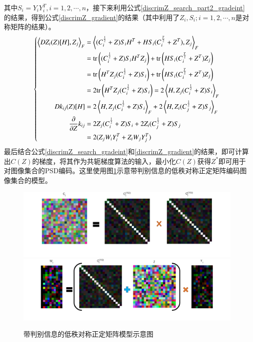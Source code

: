 其中$S_{i}=Y_{i}Y_{i}^{T},i=1,2,\cdots,n$，接下来利用公式\ref{discrimZ_search_part2_gradeint}的结果，得到公式\ref{discrimZ_gradient}的结果（其中利用了$Z_{i},S_{i};i=1,2,\cdots,n$是对称矩阵的结果）。
\begin{equation}
\label{discrimZ_gradient}
\left\{
\begin{split}
\left<DZ_i(Z)[H],Z_j\right>_{F}&=\left<(C_{i}^{\frac{1}{2}}+Z)S_{i}H^{T}+HS_{i}(C_{i}^{\frac{T}{2}}+Z^{T}),Z_j\right>_{F}\\
&={\rm tr}\left((C_{i}^{\frac{1}{2}}+Z)S_{i}H^{T}Z_j\right)+{\rm tr}\left(HS_{i}(C_{i}^{\frac{T}{2}}+Z^{T})Z_j\right)\\
&={\rm tr}\left(H^{T}Z_j(C_{i}^{\frac{1}{2}}+Z)S_{i}\right)+{\rm tr}\left(HS_{i}(C_{i}^{\frac{T}{2}}+Z^{T})Z_j\right)\\
&=2{\rm tr}\left(H^{T}Z_j(C_{i}^{\frac{1}{2}}+Z)S_{i}\right)=2\left<H,Z_j(C_{i}^{\frac{1}{2}}+Z)S_{i}\right>_{F}\\
Dk_{ij}(Z)[H]&=2\left<H,Z_j(C_{i}^{\frac{1}{2}}+Z)S_{i}\right>_{F}+2\left<H,Z_i(C_{j}^{\frac{1}{2}}+Z)S_{j}\right>_{F}\\
\frac{\partial}{\partial Z}k_{ij}&=2Z_j(C_{i}^{\frac{1}{2}}+Z)S_{i}+2Z_i(C_{j}^{\frac{1}{2}}+Z)S_{j}\\
&=2(Z_{j}W_{i}Y_{i}^{T}+Z_{i}W_{j}Y_{j}^{T})
\end{split}
\right.
\end{equation}
最后结合公式\ref{discrimZ_search_gradeint}和\ref{discrimZ_gradient}的结果，即可计算出$C(Z)$的梯度，将其作为共轭梯度算法的输入，最小化$C(Z)$获得$Z^{*}$即可用于对图像集合的PSD编码。这里使用图\ref{fig:Discrim_LRPSD}示意带判别信息的低秩对称正定矩阵编码图像集合的模型。
\begin{figure}[htb]
	\centering
      	{\includegraphics[width=\linewidth]{source/Discrim_LRPSD_sqrt.png}}
		{\includegraphics[width=\linewidth]{source/Discrim_LRPSD_W.png}}
	\caption{带判别信息的低秩对称正定矩阵模型示意图}
	\label{fig:Discrim_LRPSD}
\end{figure}
